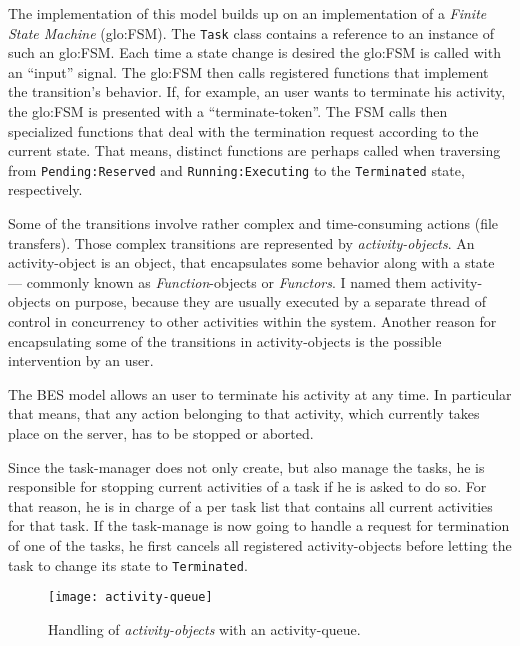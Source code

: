 The  implementation of  this model  builds up  on an  implementation  of a
\emph{Finite  State  Machine}  (\gls{glo:FSM}).  The  \texttt{Task}  class
contains a reference to an instance  of such an \gls{glo:FSM}. Each time a
state  change is  desired the  \gls{glo:FSM} is  called with  an ``input''
signal. The  \gls{glo:FSM} then calls registered  functions that implement
the transition's behavior. If, for example, an user wants to terminate his
activity, the  \gls{glo:FSM} is presented with  a ``terminate-token''. The
FSM  calls  then specialized  functions  that  deal  with the  termination
request according to the current state. That means, distinct functions are
perhaps   called  when   traversing  from   \texttt{Pending:Reserved}  and
\texttt{Running:Executing} to the \texttt{Terminated} state, respectively.

Some of the transitions  involve rather complex and time-consuming actions
(\eg file  transfers).   Those  complex  transitions are  represented  by
\emph{activity-objects}.    An   activity-object   is  an   object,   that
encapsulates  some behavior  along  with  a state  ---  commonly known  as
\emph{Function}-objects or \emph{Functors}.  I named them activity-objects
on  purpose, because they  are usually  executed by  a separate  thread of
control  in concurrency  to other  activities within  the  system. Another
reason for  encapsulating some of  the transitions in  activity-objects is
the possible intervention by an user.

The BES  model allows an  user to terminate  his activity at any  time. In
particular that means,  that any action belonging to  that activity, which
currently takes place  on the server, has to be  stopped or aborted.

Since the task-manager does not only create, but also manage the tasks, he
is responsible for stopping current activities of a task if he is asked to
do so.  For that reason, he is  in charge of a per task list that contains
all current activities  for that task. If the task-manage  is now going to
handle a request for termination of one of the tasks, he first cancels all
registered activity-objects before letting the task to change its state to
\texttt{Terminated}.

\begin{figure}[ht]
  \centering
  \texttt{[image: activity-queue]}
  \caption{Handling of \emph{activity-objects} with an activity-queue.}
  \label{fig:activity-queue}
\end{figure}

